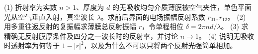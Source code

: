 (1) 折射率为实数 \(n>1\)、厚度为 \(d\) 的无吸收均匀介质薄膜被空气夹住，单色平面光从空气垂直入射，真空波长 \(\lambda\)。求前后界面的电场振幅反射系数 \(r_{01},r_{12}\)。
(2) 用多重往返反射的复振幅求薄膜总反射振幅 \(r\)，令单程相位 \(\delta=2\pi nd/\lambda\)。
(3) 求精确无反射膜厚条件及四分之一波长时的反射率，并讨论 \(n\to1\)。
(4) 说明无吸收时透射率为何等于 \(1-|r|^2\)，以及为什么不可以只将两个反射光强简单相加。
